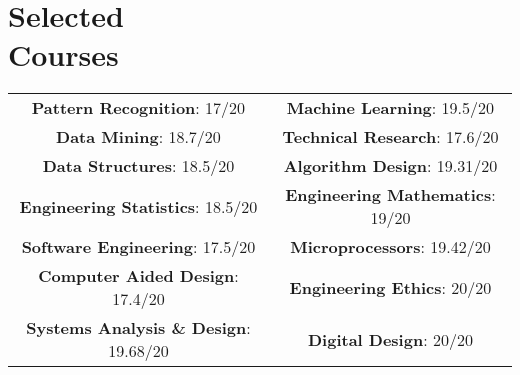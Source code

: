 \section{\sc Selected \\ Courses}
\vspace{-0.22cm}
\begin{center}
	\renewcommand{\arraystretch}{1}
	\setlength{\tabcolsep}{12pt}
	\begin{tabular}{ c c }
		\textbf{Pattern Recognition}: \hfill{17/20} & \textbf{Machine Learning}: \hfill{19.5/20} \\ 
		\textbf{Data Mining}: \hfill{18.7/20} & \textbf{Technical Research}: \hfill{17.6/20} \\
		\textbf{Data Structures}: \hfill{18.5/20} &\textbf {Algorithm Design}: \hfill{19.31/20}\\
		\textbf{Engineering Statistics}: \hfill{18.5/20} & \textbf{Engineering Mathematics}: \hfill{19/20}\\
		\textbf{Software Engineering}: \hfill{17.5/20} & \textbf{Microprocessors}: \hfill{19.42/20}\\
		\textbf{Computer Aided Design}: \hfill{17.4/20} & \textbf{Engineering Ethics}: \hfill{20/20}\\
		\textbf{Systems Analysis \& Design}: \hfill{19.68/20} & \textbf{Digital Design}: \hfill{20/20}\\
	\end{tabular}
\end{center}

\endinput